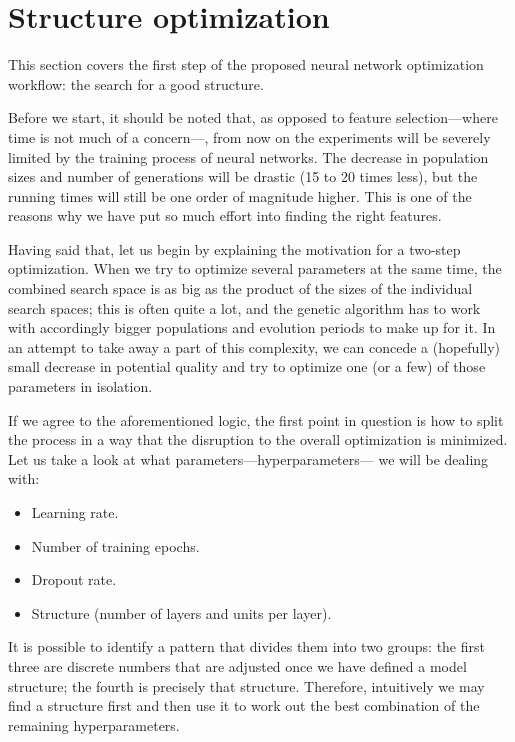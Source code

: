 \newpage

\section{Structure optimization}\label{sec:res_so}

	This section covers the first step of the proposed neural network optimization workflow: the search for a good structure.

	Before we start, it should be noted that, as opposed to feature selection---where time is not much of a concern---, from now on the experiments will be severely limited by the training process of neural networks. The decrease in population sizes and number of generations will be drastic (15 to 20 times less), but the running times will still be one order of magnitude higher. This is one of the reasons why we have put so much effort into finding the right features.

	Having said that, let us begin by explaining the motivation for a two-step optimization. When we try to optimize several parameters at the same time, the combined search space is as big as the product of the sizes of the individual search spaces; this is often quite a lot, and the genetic algorithm has to work with accordingly bigger populations and evolution periods to make up for it. In an attempt to take away a part of this complexity, we can concede a (hopefully) small decrease in potential quality and try to optimize one (or a few) of those parameters in isolation.

	If we agree to the aforementioned logic, the first point in question is how to split the process in a way that the disruption to the overall optimization is minimized. Let us take a look at what parameters---hyperparameters--- we will be dealing with:

	\begin{itemize}

		\item
		Learning rate.

		\item
		Number of training epochs.

		\item
		Dropout rate.

		\item
		Structure (number of layers and units per layer).

	\end{itemize}

	It is possible to identify a pattern that divides them into two groups: the first three are discrete numbers that are adjusted once we have defined a model structure; the fourth is precisely that structure. Therefore, intuitively we may find a structure first and then use it to work out the best combination of the remaining hyperparameters.

